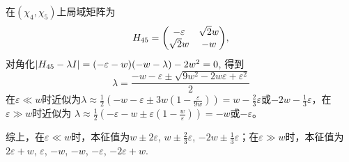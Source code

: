 \begin{enumerate}[label=\textbf{6.\Alph*}, listparindent=\parindent, leftmargin=-0.5mm]
\begin{enumerate}[listparindent=\parindent]
    在$(\chi_4,\chi_5)$上局域矩阵为
    \[H_{45} = \mqty(-\varepsilon&\sqrt{2}w\\\sqrt{2}w&-w),\]
    对角化$\abs{H_{45}-\lambda I}=(-\varepsilon-w)(-w-\lambda)-2w^2=0$, 得到
    \[\lambda = \frac{-w-\varepsilon \pm\sqrt{9w^2-2w\varepsilon+\varepsilon^2}}{2}\]
    在$\varepsilon\ll w$时近似为$\lambda\approx\frac{1}{2}(-w-\varepsilon\pm 3w(1-\frac{\varepsilon}{9w}))=w-\frac{2}{3}\varepsilon$或$-2w-\frac{1}{3}\varepsilon$，在$\varepsilon\gg w$时近似为
    $\lambda\approx\frac{1}{2}(-\varepsilon-w\pm\varepsilon(1-\frac{w}{\varepsilon}))=-w$或$-\varepsilon$。
    
    综上，在$\varepsilon\ll w$时，本征值为$w\pm2\varepsilon$, $w\pm\frac{2}{3}\varepsilon$, $-2w\pm\frac{1}{3}\varepsilon$；在$\varepsilon\gg w$时，本征值为$2\varepsilon+w$, $\varepsilon$, $-w$, $-w$, $-\varepsilon$, $-2\varepsilon+w$.
\end{enumerate}
\end{enumerate}
